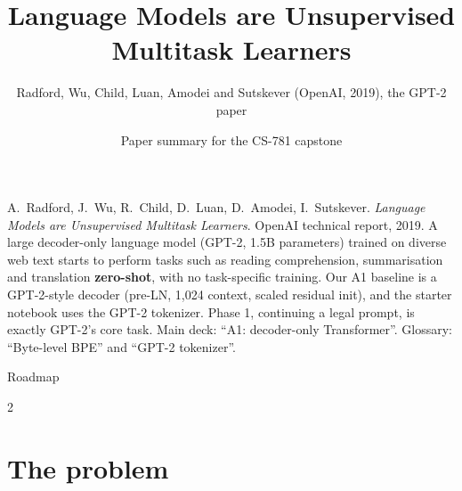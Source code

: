 \documentclass[aspectratio=169,11pt]{beamer}
\title[GPT-2]{Language Models are Unsupervised Multitask Learners}
\subtitle{Radford, Wu, Child, Luan, Amodei and Sutskever (OpenAI, 2019), the GPT-2 paper}
\author[Paper summary]{Paper summary for the CS-781 capstone}
\date{}
\begin{document}
\begin{frame}\titlepage\end{frame}

\paperglance
{A.\ Radford, J.\ Wu, R.\ Child, D.\ Luan, D.\ Amodei, I.\ Sutskever. \emph{Language Models are Unsupervised Multitask Learners}. OpenAI technical report, 2019.}
{A large decoder-only language model (GPT-2, 1.5B parameters) trained on diverse web text starts to perform tasks such as reading comprehension, summarisation and translation \textbf{zero-shot}, with no task-specific training.}
{Our A1 baseline is a GPT-2-style decoder (pre-LN, 1,024 context, scaled residual init), and the starter notebook uses the GPT-2 tokenizer. Phase 1, continuing a legal prompt, is exactly GPT-2's core task.}
{Main deck: ``A1: decoder-only Transformer''. Glossary: ``Byte-level BPE'' and ``GPT-2 tokenizer''.}

\begin{frame}{Roadmap}
  \begin{multicols}{2}\small\tableofcontents\end{multicols}
\end{frame}

\section{The problem}
\end{document}
